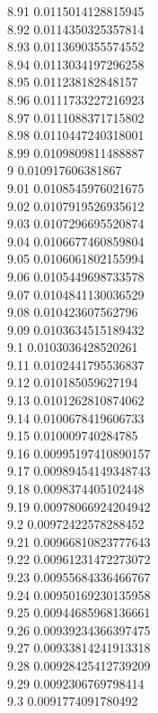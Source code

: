 {8.91	0.0115014128815945\\
8.92	0.0114350325357814\\
8.93	0.0113690355574552\\
8.94	0.0113034197296258\\
8.95	0.011238182848157\\
8.96	0.0111733227216923\\
8.97	0.0111088371715802\\
8.98	0.0110447240318001\\
8.99	0.0109809811488887\\
9	0.010917606381867\\
9.01	0.0108545976021675\\
9.02	0.0107919526935612\\
9.03	0.0107296695520874\\
9.04	0.0106677460859804\\
9.05	0.0106061802155994\\
9.06	0.0105449698733578\\
9.07	0.0104841130036529\\
9.08	0.010423607562796\\
9.09	0.0103634515189432\\
9.1	0.0103036428520261\\
9.11	0.0102441795536837\\
9.12	0.010185059627194\\
9.13	0.0101262810874062\\
9.14	0.0100678419606733\\
9.15	0.010009740284785\\
9.16	0.00995197410890157\\
9.17	0.00989454149348743\\
9.18	0.0098374405102448\\
9.19	0.00978066924204942\\
9.2	0.00972422578288452\\
9.21	0.00966810823777643\\
9.22	0.00961231472273072\\
9.23	0.00955684336466767\\
9.24	0.00950169230135958\\
9.25	0.00944685968136661\\
9.26	0.00939234366397475\\
9.27	0.00933814241913318\\
9.28	0.00928425412739209\\
9.29	0.0092306769798414\\
9.3	0.0091774091780492\\
}
